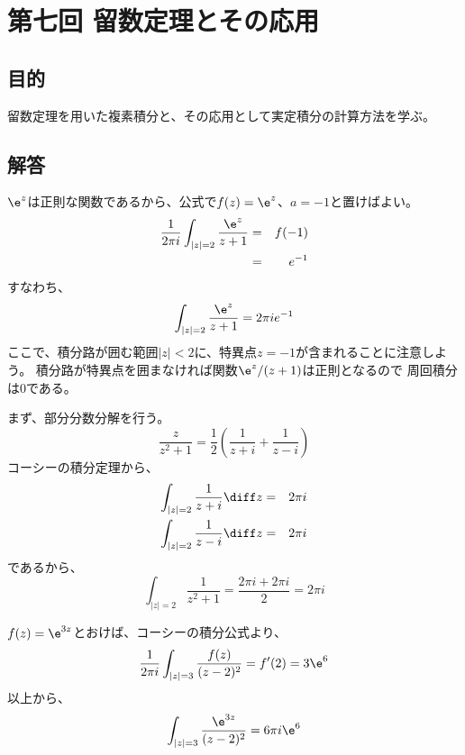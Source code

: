 \section{第七回 留数定理とその応用}

\subsection{目的}

留数定理を用いた複素積分と、その応用として実定積分の計算方法を学ぶ。

\subsection{解答}

$\e^{z}$は正則な関数であるから、公式で$f(z)=\e^z$、$a=-1$と置けばよい。
\begin{eqnarray}
  \frac{1}{2\pi i} \int_{|z|=2} \frac{\e^z}{z+1} &=& f(-1)\\
  &=& e^{-1}
\end{eqnarray}
すなわち、
\begin{equation}
  \int_{|z|=2} \frac{\e^z}{z+1} = 2\pi i e^{-1}
\end{equation}
ここで、積分路が囲む範囲$|z|<2$に、特異点$z=-1$が含まれることに注意しよう。
積分路が特異点を囲まなければ関数$\e^z/(z+1)$は正則となるので
周回積分は$0$である。

まず、部分分数分解を行う。
\begin{equation}
  \frac{z}{z^2+1} = \frac{1}{2} \left( \frac{1}{z+i} + \frac{1}{z-i} \right)
\end{equation}
コーシーの積分定理から、
\begin{eqnarray}
  \int_{|z|=2} \frac{1}{z+i} \diff z & =& 2 \pi i \\
  \int_{|z|=2} \frac{1}{z-i} \diff z & =& 2 \pi i \\
\end{eqnarray}
であるから、
\begin{equation}
  \int_{|z|=2} \frac{1}{z^2+1} = \frac{2\pi i + 2\pi i}{2} = 2 \pi i
\end{equation}

$f(z) = \e^{3z}$とおけば、コーシーの積分公式より、
\begin{equation}
  \frac{1}{2\pi i} \int_{|z|=3} \frac{f(z)}{(z-2)^2} = f'(2) = 3\e^{6}
\end{equation}
以上から、
\begin{equation}
  \int_{|z|=3} \frac{\e^{3z}}{(z-2)^2} = 6 \pi i \e^{6}
\end{equation}

